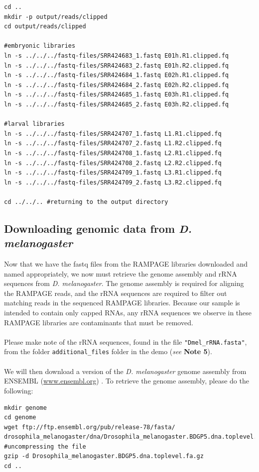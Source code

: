 \documentclass[runningheads,a4paper]{llncs}
\begin{document}
\begin{linenumbers}
\noindent
\begin{verbatim}
cd ..
mkdir -p output/reads/clipped
cd output/reads/clipped

#embryonic libraries
ln -s ../../../fastq-files/SRR424683_1.fastq E01h.R1.clipped.fq 
ln -s ../../../fastq-files/SRR424683_2.fastq E01h.R2.clipped.fq
ln -s ../../../fastq-files/SRR424684_1.fastq E02h.R1.clipped.fq
ln -s ../../../fastq-files/SRR424684_2.fastq E02h.R2.clipped.fq
ln -s ../../../fastq-files/SRR424685_1.fastq E03h.R1.clipped.fq
ln -s ../../../fastq-files/SRR424685_2.fastq E03h.R2.clipped.fq

#larval libraries
ln -s ../../../fastq-files/SRR424707_1.fastq L1.R1.clipped.fq 
ln -s ../../../fastq-files/SRR424707_2.fastq L1.R2.clipped.fq
ln -s ../../../fastq-files/SRR424708_1.fastq L2.R1.clipped.fq
ln -s ../../../fastq-files/SRR424708_2.fastq L2.R2.clipped.fq
ln -s ../../../fastq-files/SRR424709_1.fastq L3.R1.clipped.fq
ln -s ../../../fastq-files/SRR424709_2.fastq L3.R2.clipped.fq

cd ../../.. #returning to the output directory
\end{verbatim}

\subsection{Downloading genomic data from \textit{D. melanogaster}}
Now that we have the fastq files from the RAMPAGE libraries downloaded and named appropriately, we now must retrieve the genome assembly and rRNA sequences from \textit{D. melanogaster}.
The genome assembly is required for aligning the RAMPAGE reads, and the rRNA sequences are required to filter out matching reads in the sequenced RAMPAGE libraries.
Because our sample is intended to contain only capped RNAs, any rRNA sequences we observe in these RAMPAGE libraries are contaminants that must be removed.\\
\\
\noindent
Please make note of the rRNA sequences, found in the file \texttt{"Dmel\_rRNA.fasta"}, from the folder \texttt{additional\_files} folder in the demo (\textit{see} \textbf{Note 5}).
\\
\\
\noindent
We will then download a version of the \textit{D. melanogaster} genome assembly from ENSEMBL (\url{www.ensembl.org}) \cite{Yates:2016tbc}.
To retrieve the genome assembly, please do the following:

\noindent
\begin{verbatim}
mkdir genome
cd genome
wget ftp://ftp.ensembl.org/pub/release-78/fasta/
drosophila_melanogaster/dna/Drosophila_melanogaster.BDGP5.dna.toplevel.fa.gz
#uncompressing the file
gzip -d Drosophila_melanogaster.BDGP5.dna.toplevel.fa.gz
cd ..
\end{verbatim}


\end{linenumbers}
\end{document}

